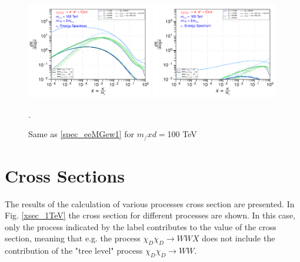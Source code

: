 \documentclass[epj,nopacs,fleqn]{svjour}
\begin{document}
\begin{figure}[!b]
	\subfigure
	{ \includegraphics[width=0.49\textwidth]{Fig/xdxd_ee_eeZ_eveW/100_neutrinos_mu_ee_eeZ_eveW_100.pdf}}
	\subfigure
	{ \includegraphics[width=0.49\textwidth]{Fig/xdxd_ee_eeZ_eveW/100_neutrinos_tau_ee_eeZ_eveW_100.pdf}}
	\caption{Same as \ref{spec_eeMGew1} for  $m_/xd=$100 TeV}.
	\label{spec_eeMGew100}
\end{figure}






\clearpage
\section{Cross Sections}
The results of the calculation of various processes cross section are presented. In Fig. \ref{xsec_1TeV} the cross section for different processes are shown. In this case, only the process indicated by the label contributes to the value of the cross section, meaning that e.g. the process $\chi_D \chi_D \rightarrow WW X$ does not include the contribution of the "tree level" process $\chi_D \chi_D \rightarrow WW$. 
\end{document}
